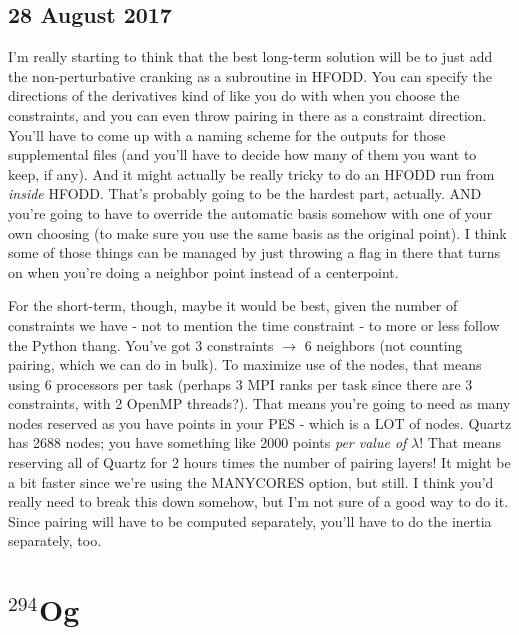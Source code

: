 \documentclass[]{report}
\begin{document}
\subsection*{28 August 2017}
I'm really starting to think that the best long-term solution will be to just add the non-perturbative cranking as a subroutine in HFODD. You can specify the directions of the derivatives kind of like you do with when you choose the constraints, and you can even throw pairing in there as a constraint direction. You'll have to come up with a naming scheme for the outputs for those supplemental files (and you'll have to decide how many of them you want to keep, if any). And it might actually be really tricky to do an HFODD run from \textit{inside} HFODD. That's probably going to be the hardest part, actually. AND you're going to have to override the automatic basis somehow with one of your own choosing (to make sure you use the same basis as the original point). I think some of those things can be managed by just throwing a flag in there that turns on when you're doing a neighbor point instead of a centerpoint.

For the short-term, though, maybe it would be best, given the number of constraints we have - not to mention the time constraint - to more or less follow the Python thang. You've got 3 constraints $\rightarrow$ 6 neighbors (not counting pairing, which we can do in bulk). To maximize use of the nodes, that means using 6 processors per task (perhaps 3 MPI ranks per task since there are 3 constraints, with 2 OpenMP threads?). That means you're going to need as many nodes reserved as you have points in your PES - which is a LOT of nodes. Quartz has 2688 nodes; you have something like 2000 points \textit{per value of} $\lambda$! That means reserving all of Quartz for 2 hours times the number of pairing layers! It might be a bit faster since we're using the MANYCORES option, but still. I think you'd really need to break this down somehow, but I'm not sure of a good way to do it. Since pairing will have to be computed separately, you'll have to do the inertia separately, too.


\section*{$^{294}$Og}
\end{document}
